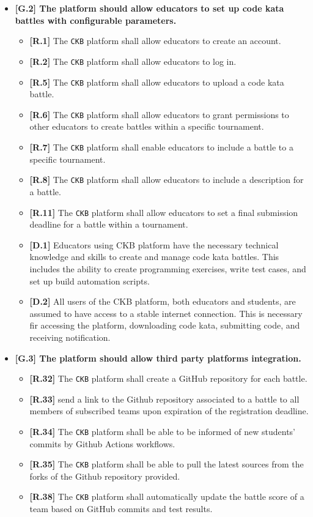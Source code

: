 \begin{itemize}
    \item \textbf{{[G.2]} The platform should allow educators to set up code kata battles with configurable parameters. }
        \begin{itemize}
            \item \textbf{[R.1]} The \verb|CKB| platform shall allow educators to create an account.
            \item \textbf{[R.2]} The \verb|CKB| platform shall allow educators to log in.
            \item \textbf{[R.5]} The \verb|CKB| platform shall allow educators to upload a code kata battle. 
            \item \textbf{[R.6]} The \verb|CKB| platform shall allow educators to grant permissions to other educators to create battles within a specific tournament.
            \item \textbf{[R.7]} The \verb|CKB| platform shall enable educators to include a battle to a specific tournament.
            \item \textbf{[R.8]} The \verb|CKB| platform shall allow educators to include a description for a battle.     
            \item \textbf{[R.11]} The \verb|CKB| platform shall allow educators to set a final submission deadline for a battle within a tournament.
            \item \textbf{[D.1]} Educators using CKB platform have the necessary technical knowledge and skills to create and manage code kata battles. 
            This includes the ability to create programming exercises, write test cases, and set up build automation scripts.
            \item \textbf{[D.2]} All users of the CKB platform, both educators and students, are assumed to have access to a stable internet connection. This is
            necessary fir accessing the platform, downloading code kata, submitting code, and receiving notification.
        \end{itemize}

        \item \textbf{{[G.3]} The platform should allow third party platforms integration. }
        \begin{itemize}
            \item \textbf{[R.32]} The \verb|CKB| platform shall create a GitHub repository for each battle.
            \item \textbf{[R.33]} send a link to the Github repository associated to a battle to all members of subscribed teams upon expiration of the registration deadline. 
            \item \textbf{[R.34]} The \verb|CKB| platform shall be able to be informed of new students' commits by Github Actions workflows.
            \item \textbf{[R.35]} The \verb|CKB| platform shall be able to pull the latest sources from the forks of the Github repository provided.
            \item \textbf{[R.38]} The \verb|CKB| platform shall automatically update the battle score of a team based on GitHub commits and test results.


\end{itemize}
\end{itemize}
